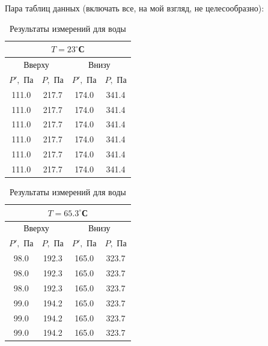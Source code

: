 \documentclass[a4paper,12pt]{article}
\theoremstyle{definition}
\begin{document}
	Пара таблиц данных (включать все, на мой взгляд, не целесообразно):
	\begin{table}[H]
		\centering
		\begin{minipage}{.49\linewidth}
			\centering
			\bgroup
			\def\arraystretch{1.2}
				\begin{tabular}{|c|c|c|c|}
					\hline
					\multicolumn{4}{|c|}{$T = 23 ^\circ$С}\\
					\hline
					\multicolumn{2}{|c|}{Вверху}&\multicolumn{2}{c|}{Внизу}\\
					\hline
					$P',$ Па& $P,$ Па &$P',$ Па& $P,$ Па\\
					\hline
					111.0&217.7&174.0&341.4\\
					\hline
					111.0&217.7&174.0&341.4\\
					\hline
					111.0&217.7&174.0&341.4\\
					\hline
					111.0&217.7&174.0&341.4\\
					\hline
					111.0&217.7&174.0&341.4\\
					\hline
					111.0&217.7&174.0&341.4\\
					\hline
				\end{tabular}
			\egroup
		\end{minipage}
		\begin{minipage}{.49\linewidth}
			\centering
			\bgroup
			\def\arraystretch{1.2}%
				\begin{tabular}{|c|c|c|c|}
					\hline
					\multicolumn{4}{|c|}{$T = 65.3 ^\circ$С}\\
					\hline
					\multicolumn{2}{|c|}{Вверху}&\multicolumn{2}{c|}{Внизу}\\
					\hline
					$P',$ Па& $P,$ Па &$P',$ Па& $P,$ Па\\
					\hline
					98.0& 192.3&165.0&323.7\\
					\hline
					98.0& 192.3&165.0&323.7\\
					\hline
					98.0& 192.3&165.0&323.7\\
					
					\hline
					99.0& 194.2&165.0&323.7\\\hline
					99.0& 194.2&165.0&323.7\\
					\hline
					99.0& 194.2&165.0&323.7\\
					\hline
				\end{tabular}
			\egroup
		\end{minipage}
		\caption{Результаты измерений для воды}
		\label{water}
	\end{table}
\end{document}

